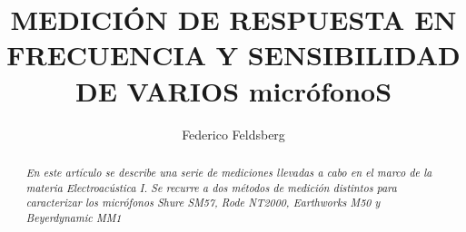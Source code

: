 \documentclass[]{article}
\title{\textbf{\LARGE{\textsf{MEDICIÓN DE RESPUESTA EN FRECUENCIA Y
 SENSIBILIDAD DE VARIOS micrófonoS}}}}
\date{} %
\begin{document}


\renewcommand{\headrulewidth}{0pt} %


\author[1]{Federico Feldsberg} %


\begin{minipage}[h]{\textwidth} %
    \maketitle
    \thispagestyle{fancy}
    \fancyhf{}
    \cfoot{\thepage}

\end{minipage}


\begin{abstract}
\textit{En este artículo se describe una serie de mediciones llevadas a cabo
en el marco de la materia Electroacústica I. Se recurre a dos métodos
de medición distintos para caracterizar los micrófonos Shure SM57,
Rode NT2000, Earthworks M50 y Beyerdynamic MM1}
\end{abstract}
\end{document}
